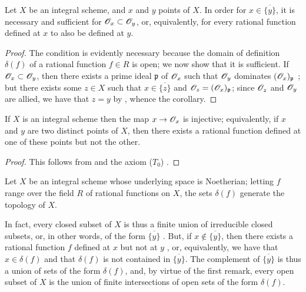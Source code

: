 \begin{corollary}[8.2.3]
\label{I.8.2.3}
Let $X$ be an integral scheme, and $x$ and $y$ points of $X$.
In order for $x\in\overline{\{y\}}$, it is necessary and
sufficient for $\mathscr{O}_x\subset\mathscr{O}_y$, or, equivalently, for every rational
function defined at $x$ to also be defined at $y$.
\end{corollary}

\begin{proof}
The condition is evidently necessary because the domain of definition $\delta(f)$ of a rational function $f\in R$ is open;
we now show that it is sufficient.
If $\mathscr{O}_x\subset\mathscr{O}_y$, then there exists a prime ideal $\mathfrak{p}$ of $\mathscr{O}_x$ such that $\mathscr{O}_y$ dominates $(\mathscr{O}_x)_\mathfrak{p}$ ;
but  there exists some $z\in X$ such that $x\in\overline{\{z\}}$ and $\mathscr{O}_z=(\mathscr{O}_x)_\mathfrak{p}$;
since $\mathscr{O}_z$ and $\mathscr{O}_y$ are allied, we have that $z=y$ by , whence the corollary.
\end{proof}

\begin{corollary}[8.2.4]
\label{I.8.2.4}
If $X$ is an integral scheme then the map $x\to\sh{O}_x$ is injective; equivalently, if $x$ and $y$ are two distinct points of $X$, then there exists a rational function defined at one of these points but not the other.
\end{corollary}

\begin{proof}
This follows from  and the axiom ($T_0$) .
\end{proof}

\begin{corollary}[8.2.5]
\label{I.8.2.5}
Let $X$ be an integral scheme whose underlying space is Noetherian;
letting $f$ range over the field $R$ of rational functions on $X$, the sets $\delta(f)$ generate the topology of $X$.
\end{corollary}

In fact, every closed subset of $X$ is thus a finite union of irreducible closed subsets, or, in other words, of the form $\overline{\{y\}}$ .
But, if $x\not\in\overline{\{y\}}$, then there exists a rational function $f$ defined at $x$ but not at $y$ , or, equivalently, we have that $x\in\delta(f)$ and that $\delta(f)$ is not contained in $\overline{\{y\}}$.
The complement of $\overline{\{y\}}$ is thus a union of sets of the form $\delta(f)$, and, by virtue of the first remark, every open subset of $X$ is the union of finite intersections of open sets of the form $\delta(f)$.

